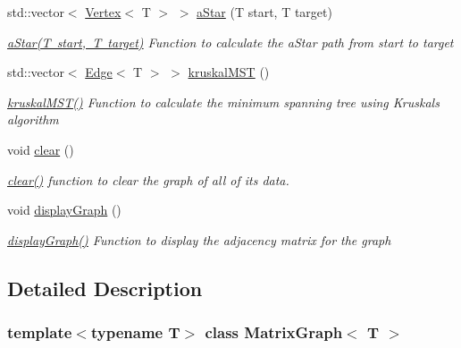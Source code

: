 \begin{DoxyCompactItemize}
std\+::vector$<$ \mbox{\hyperlink{struct_vertex}{Vertex}}$<$ T $>$ $>$ \mbox{\hyperlink{class_matrix_graph_a998736fb9402f7f40d97a60d8441c1ec}{a\+Star}} (T start, T target)
\begin{DoxyCompactList}\small\item\em \mbox{\hyperlink{class_matrix_graph_a998736fb9402f7f40d97a60d8441c1ec}{a\+Star(\+T start, T target)}} Function to calculate the a\+Star path from start to target \end{DoxyCompactList}\item 
std\+::vector$<$ \mbox{\hyperlink{struct_edge}{Edge}}$<$ T $>$ $>$ \mbox{\hyperlink{class_matrix_graph_ae83e60b9abc197b2959481d25555e9af}{kruskal\+M\+ST}} ()
\begin{DoxyCompactList}\small\item\em \mbox{\hyperlink{class_matrix_graph_ae83e60b9abc197b2959481d25555e9af}{kruskal\+M\+S\+T()}} Function to calculate the minimum spanning tree using Kruskal\textquotesingle{}s algorithm \end{DoxyCompactList}\item 
void \mbox{\hyperlink{class_matrix_graph_a3bf901c33eb9d46bee8b05f71b16a9ed}{clear}} ()
\begin{DoxyCompactList}\small\item\em \mbox{\hyperlink{class_matrix_graph_a3bf901c33eb9d46bee8b05f71b16a9ed}{clear()}} function to clear the graph of all of it\textquotesingle{}s data. \end{DoxyCompactList}\item 
void \mbox{\hyperlink{class_matrix_graph_ab77cb8ae78964112e9af1af96614f21a}{display\+Graph}} ()
\begin{DoxyCompactList}\small\item\em \mbox{\hyperlink{class_matrix_graph_ab77cb8ae78964112e9af1af96614f21a}{display\+Graph()}} Function to display the adjacency matrix for the graph \end{DoxyCompactList}\end{DoxyCompactItemize}


\subsection{Detailed Description}
\subsubsection*{template$<$typename T$>$\newline
class Matrix\+Graph$<$ T $>$}

